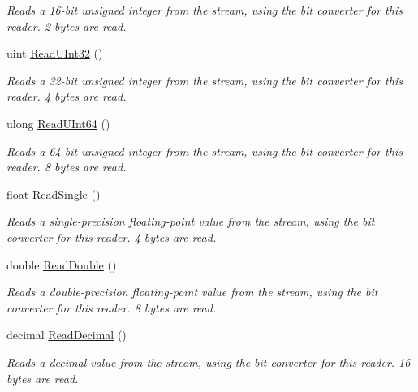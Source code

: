 \begin{DoxyCompactItemize}
\begin{DoxyCompactList}\small\item\em Reads a 16-\/bit unsigned integer from the stream, using the bit converter for this reader. 2 bytes are read. \end{DoxyCompactList}\item 
uint \mbox{\hyperlink{class_t_net_1_1_i_o_1_1_endian_binary_reader_ae5a1827eb24391ffb6fac5472433cb68}{Read\+U\+Int32}} ()
\begin{DoxyCompactList}\small\item\em Reads a 32-\/bit unsigned integer from the stream, using the bit converter for this reader. 4 bytes are read. \end{DoxyCompactList}\item 
ulong \mbox{\hyperlink{class_t_net_1_1_i_o_1_1_endian_binary_reader_a1099cd78f47f8d191142cf344f8c12cb}{Read\+U\+Int64}} ()
\begin{DoxyCompactList}\small\item\em Reads a 64-\/bit unsigned integer from the stream, using the bit converter for this reader. 8 bytes are read. \end{DoxyCompactList}\item 
float \mbox{\hyperlink{class_t_net_1_1_i_o_1_1_endian_binary_reader_a5b8372852eb61c258d3c3bb76f0f0d1e}{Read\+Single}} ()
\begin{DoxyCompactList}\small\item\em Reads a single-\/precision floating-\/point value from the stream, using the bit converter for this reader. 4 bytes are read. \end{DoxyCompactList}\item 
double \mbox{\hyperlink{class_t_net_1_1_i_o_1_1_endian_binary_reader_a17a0fbf3fff03a507af84dbf824d4915}{Read\+Double}} ()
\begin{DoxyCompactList}\small\item\em Reads a double-\/precision floating-\/point value from the stream, using the bit converter for this reader. 8 bytes are read. \end{DoxyCompactList}\item 
decimal \mbox{\hyperlink{class_t_net_1_1_i_o_1_1_endian_binary_reader_aa4b6ba813801ec1f4587396c5ab1be3c}{Read\+Decimal}} ()
\begin{DoxyCompactList}\small\item\em Reads a decimal value from the stream, using the bit converter for this reader. 16 bytes are read. \end{DoxyCompactList}\item 

\end{DoxyCompactItemize}

